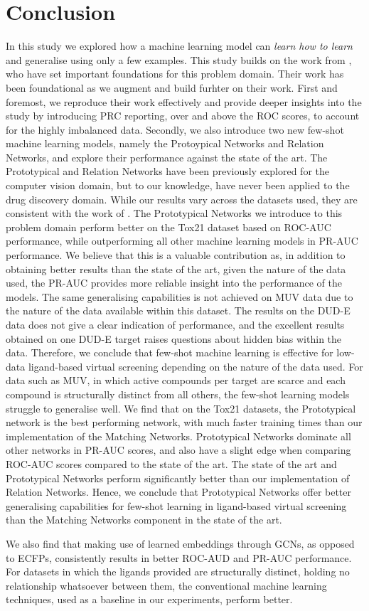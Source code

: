 \section{Conclusion}

In this study we explored how a machine learning model can \textit{learn how to learn} and generalise using only a few examples. This study builds on the work from \citet{altae2017low}, who have set important foundations for this problem domain. Their work has been foundational as we augment and build furhter on their work. First and foremost, we reproduce their work effectively and provide deeper insights into the study by introducing PRC reporting, over and above the ROC scores, to account for the highly imbalanced data. Secondly, we also introduce two new few-shot machine learning models, namely the Protoypical Networks and Relation Networks, and explore their performance against the state of the art. The Prototypical and Relation Networks have been previously explored for the computer vision domain, but to our knowledge, have never been applied to the drug discovery domain. While our results vary across the datasets used, they are consistent with the work of \citet{altae2017low}. The Prototypical Networks we introduce to this problem domain perform better on the Tox21 dataset based on ROC-AUC performance, while outperforming all other machine learning models in PR-AUC performance. We believe that this is a valuable contribution as, in addition to obtaining better results than the state of the art, given the nature of the data used, the PR-AUC provides more reliable insight into the performance of the models. The same generalising capabilities is not achieved on MUV data due to the nature of the data available within this dataset. The results on the DUD-E data does not give a clear indication of performance, and the excellent results obtained on one DUD-E target raises questions about hidden bias within the data. Therefore, we conclude that few-shot machine learning is effective for low-data ligand-based virtual screening depending on the nature of the data used. For data such as MUV, in which active compounds per target are scarce and each compound is structurally distinct from all others, the few-shot learning models struggle to generalise well. We find that on the Tox21 datasets, the Prototypical network is the best performing network, with much faster training times than our implementation of the Matching Networks. Prototypical Networks dominate all other networks in PR-AUC scores, and also have a slight edge when comparing ROC-AUC scores compared to the state of the art. The state of the art and Prototypical Networks perform significantly better than our implementation of Relation Networks. Hence, we conclude that Prototypical Networks offer better generalising capabilities for few-shot learning in ligand-based virtual screening than the Matching Networks component in the state of the art.

We also find that making use of learned embeddings through GCNs, as opposed to ECFPs, consistently results in better ROC-AUD and PR-AUC performance. For datasets in which the ligands provided are structurally distinct, holding no relationship whatsoever between them, the conventional machine learning techniques, used as a baseline in our experiments, perform better.

